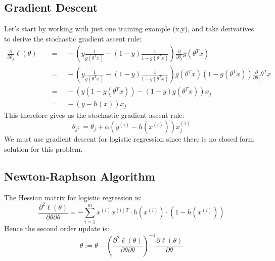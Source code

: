 \documentclass[twoside,twocolumn]{article}
\begin{document}
\subsection{Gradient Descent}
Let’s start by working with just one training example (x,y), and take
derivatives to derive the stochastic gradient ascent rule:
\begin{equation}
  \begin{aligned}
    \frac { \partial } { \partial \theta _ { j } } \ell ( \theta ) \quad & = \quad - \left( y \frac { 1 } { g \left( \theta ^ { T } x \right) } - ( 1 - y ) \frac { 1 } { 1 - g \left( \theta ^ { T } x \right) } \right) \frac { \partial } { \partial \theta _ { j } } g \left( \theta ^ { T } x \right) \\
    & = \quad - \left( y \frac { 1 } { g \left( \theta ^ { T } x \right) } - ( 1 - y ) \frac { 1 } { 1 - g \left( \theta ^ { T } x \right) } \right) g \left( \theta ^ { T } x \right) \left( 1 - g \left( \theta ^ { T } x \right) \right) \frac { \partial } { \partial \theta _ { j } } \theta ^ { T } x \\
    & = \quad - \left( y \left( 1 - g \left( \theta ^ { T } x \right) \right) - ( 1 - y ) g \left( \theta ^ { T } x \right) \right) x _ { j } \\
    & = \quad - \left( y - h ( x ) \right) x _ { j }
  \end{aligned}
\end{equation}
This therefore gives us the stochastic gradient ascent rule:
\begin{equation}
  \theta _ { j } : = \theta _ { j } + \alpha \left( y ^ { ( i ) } - h \left( x ^ { ( i ) } \right) \right) x _ { j } ^ { ( i ) }
\end{equation}
We must use gradient descent for logistic regression since there is no closed
form solution for this problem.
\subsection{Newton-Raphson Algorithm}
The Hessian matrix for logistic regression is:
\begin{equation}
  \frac{\partial^2 \ell(\theta)}{\partial \theta \partial \theta} = -\sum_{i=1}^m x^{(i)} x^{(i) T} \cdot h\left(x^{(i)}\right) \cdot \left(1-h\left(x^{(i)}\right)\right)
\end{equation}
Hence the second order update is:
\begin{equation}
  \theta := \theta - \left( \frac{\partial^2 \ell(\theta)}{\partial \theta \partial \theta} \right)^{-1} \frac{\partial \ell(\theta)}{\partial \theta}
\end{equation}
\end{document}
